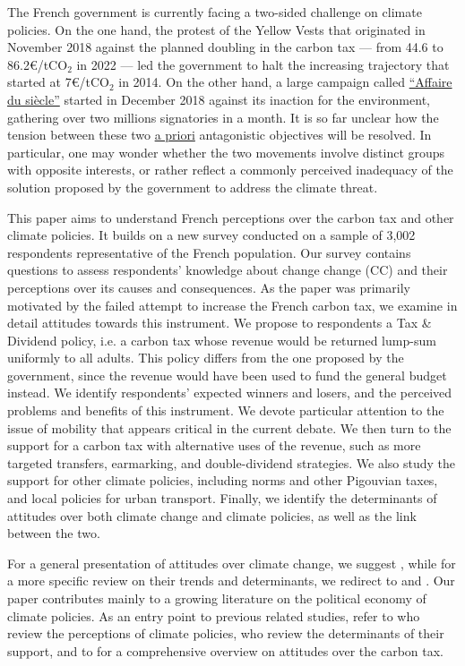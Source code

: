 \documentclass[english,5p,authoryear]{elsarticle}
\begin{document}
The French government is currently facing a two-sided challenge on climate policies. On the one hand, the protest of the Yellow Vests that originated in November 2018 against the planned doubling in the carbon tax  --- from 44.6 to 86.2\euro{}/tCO$_2$ in 2022 --- led the government to halt the increasing trajectory that started at 7\euro{}/tCO$_2$ in 2014. On the other hand, a large campaign called \href{https://laffairedusiecle.net/}{``Affaire du siècle''} started in December 2018 against its inaction for the environment, gathering over two millions signatories in a month. It is so far unclear how the tension between these two \uline{a priori} antagonistic objectives will be resolved. In particular, one may wonder whether the two movements involve distinct groups with opposite interests, or rather reflect a commonly perceived inadequacy of the solution proposed by the government to address the climate threat.

%

This paper aims to understand French perceptions over the carbon tax and other climate policies. It builds on a new survey conducted on a sample of 3,002 respondents representative of the French population. Our survey contains questions to assess respondents' knowledge about change change (CC) and their perceptions over its causes and consequences. As the paper was primarily motivated by the failed attempt to increase the French carbon tax, we examine in detail attitudes towards this instrument. We propose to respondents a Tax \& Dividend policy, i.e. a carbon tax whose revenue would be returned lump-sum uniformly to all adults. This policy differs from the one proposed by the government, since the revenue would have been used to fund the general budget instead. We identify respondents' expected winners and losers, and the perceived problems and benefits of this instrument. We devote particular attention to the issue of mobility that appears critical in the current debate. We then turn to the support for a carbon tax with alternative uses of the revenue, such as more targeted transfers, earmarking, and double-dividend strategies. We also study the support for other climate policies, including norms and other Pigouvian taxes, and local policies for urban transport. Finally, we identify the determinants of attitudes over both climate change and climate policies, as well as the link between the two.
%
%

%
%

%
For a general presentation of attitudes over climate change, we suggest \citet{whitmarsh_2_2018}, while for a more specific review on their trends and determinants, we redirect to \citet{brechin_public_2010} and \citet{ziegler_political_2017}. Our paper contributes mainly to a growing literature on the political economy of climate policies. As an entry point to previous related studies, refer to \citet{maestre-andres_perceived_2019} who review the perceptions of climate policies, \citet{drews_van_der_bergh_2016} who review the determinants of their support, and to \citet{carattini_overcoming_2018} for a comprehensive overview on attitudes over the carbon tax. 
%
\end{document}
